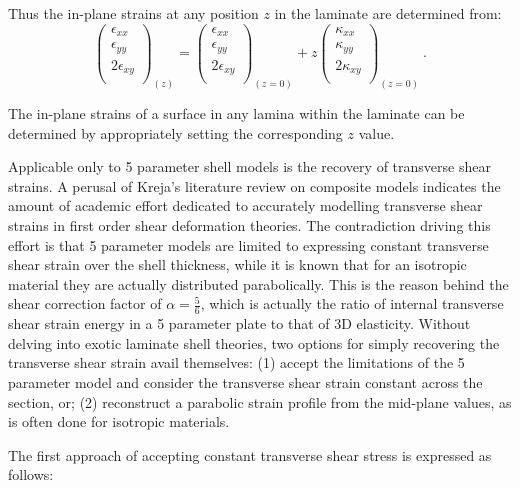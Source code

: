 Thus the in-plane strains at any position $z$ in the laminate are determined from:
\begin{equation} 
\begin{pmatrix}
\epsilon_{xx} \\
\epsilon_{yy} \\
2\epsilon_{xy}\\
\end{pmatrix}_{(z)}
=
\begin{pmatrix}
\epsilon_{xx} \\
\epsilon_{yy} \\
2\epsilon_{xy}\\
\end{pmatrix}_{(z=0)}
+
z
\begin{pmatrix}
\kappa_{xx}\\
\kappa_{yy}\\
2\kappa_{xy} \\
\end{pmatrix}_{(z=0)}
\label{eqscomp_strain_recovery2}\ .
\end{equation}

The in-plane strains of a surface in any lamina within the laminate can be determined by appropriately setting the corresponding $z$ value.

Applicable only to 5 parameter shell models is the recovery of transverse shear strains. A perusal of Kreja's literature review on composite models \cite{kreja2011literature} indicates the amount of academic effort dedicated to accurately modelling transverse shear strains in first order shear deformation theories. The contradiction driving this effort is that 5 parameter models are limited to expressing constant transverse shear strain over the shell thickness, while it is known that for an isotropic material they are actually distributed parabolically. This is the reason behind the shear correction factor of $\alpha = \frac{5}{6}$, which is actually the ratio of internal transverse shear strain energy in a 5 parameter plate to that of 3D elasticity. Without delving into exotic laminate shell theories, two options for simply recovering the transverse shear strain avail themselves: (1) accept the limitations of the 5 parameter model and consider the transverse shear strain constant across the section, or; (2) reconstruct a parabolic strain profile from the mid-plane values, as is often done for isotropic materials.

The first approach of accepting constant transverse shear stress is expressed as follows:

